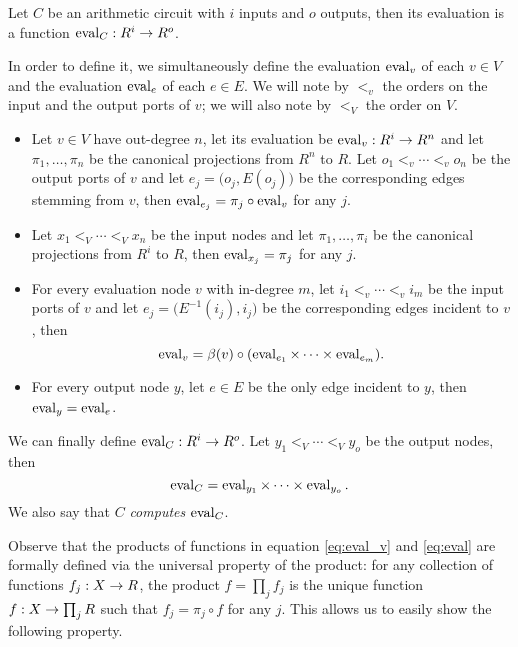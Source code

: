 \begin{definition}
  \label{def:eval}
  Let $C$ be an arithmetic circuit with $i$ inputs and $o$ outputs,
  then its evaluation is a function $\operatorname{eval}_C:R^i\rightarrow R^o$.

  In order to define it, we simultaneously define the evaluation
  $\operatorname{eval}_v$ of each $v\in V$ and the evaluation $\operatorname{eval}_e$ of each
  $e\in E$. We will note by $<_v$ the orders on the input and the
  output ports of $v$; we will also note by $<_V$ the order on $V$.
  \begin{itemize}
  \item Let $v\in V$ have out-degree $n$, let its evaluation be
    $\operatorname{eval}_v:R^i\rightarrow R^n$ and let $\pi_1,\ldots,\pi_n$ be the canonical
    projections from $R^n$ to $R$. Let $o_1<_v\cdots<_vo_n$ be the
    output ports of $v$ and let $e_j=\bigl(o_j,E(o_j)\bigr)$ be the
    corresponding edges stemming from $v$, then $\operatorname{eval}_{e_j} =
    \pi_j\circ\operatorname{eval}_v$ for any $j$.
  \item Let $x_1<_V\cdots<_Vx_n$ be the input nodes and let
    $\pi_1,\ldots,\pi_i$ be the canonical projections from $R^i$ to
    $R$, then $\operatorname{eval}_{x_j}=\pi_j$ for any $j$.
  \item For every evaluation node $v$ with in-degree $m$, let
    $i_1<_v\cdots<_vi_m$ be the input ports of $v$ and let
    $e_j=\bigl(E^{-1}(i_j),i_j\bigr)$ be the corresponding edges
    incident to $v$, then
    \begin{equation}
      \label{eq:eval_v}
      \operatorname{eval}_v = \beta(v) \circ (\operatorname{eval}_{e_1} \times \cdots \times \operatorname{eval}_{e_m})
      \text{.}
    \end{equation}
  \item For every output node $y$, let $e\in E$ be the only edge
    incident to $y$, then $\operatorname{eval}_y=\operatorname{eval}_e$.
  \end{itemize}

  We can finally define $\operatorname{eval}_C:R^i\rightarrow R^o$. Let $y_1<_V\cdots<_Vy_o$
  be the output nodes, then
  \begin{equation}
    \label{eq:eval}
    \operatorname{eval}_C = \operatorname{eval}_{y_1} \times \cdots \times \operatorname{eval}_{y_o}
    \text{.}
  \end{equation}
  We also say that $C$ \emph{computes} $\operatorname{eval}_C$.
\end{definition}

Observe that the products of functions in equation \eqref{eq:eval_v}
and \eqref{eq:eval} are formally defined via the universal property of
the product: for any collection of functions $f_j:X\rightarrow R$, the product
$f=\prod_jf_j$ is the unique function $f:X\rightarrow \prod_jR$ such that
$f_j=\pi_j\circ f$ for any $j$. This allows us to easily show the
following property.

